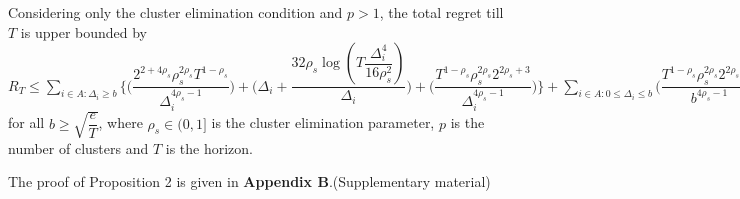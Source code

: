 	
	
	

\begin{proposition}
\label{Result:Prop:2}
Considering only the cluster elimination condition and $p>1$, the total regret till $T$ is upper bounded by $R_{T}\leq \sum_{i\in A:\Delta_{i}\geq b}\bigg\lbrace \bigg(\dfrac{2^{2+4\rho_{s}}\rho_{s}^{2\rho_{s}}T^{1-\rho_{s}}}{\Delta_{i}^{4\rho_{s}-1}}\bigg) + \bigg(\Delta_{i}+\dfrac{32\rho_{s}\log{(T\dfrac{\Delta_{i}^{4}}{16\rho_{s}^{2}})}}{\Delta_{i}}\bigg)  +  \bigg(\dfrac{T^{1-\rho_{s}}\rho_{s}^{2\rho_{s}}2^{2\rho_{s}+3}}{\Delta_{i}^{4\rho_{s} -1}} \bigg)\bigg \rbrace +\sum_{i\in A:0\leq\Delta_{i}\leq b}\bigg(\dfrac{T^{1-\rho_{s}}\rho_{s}^{2\rho_{s}}2^{2\rho_{s}+3}}{b^{4\rho_{s} -1}} \bigg) + max_{i:\Delta_{i}\leq b}\Delta_{i}T$ for all $b\geq \sqrt{\dfrac{e}{T}}$, where $\rho_{s}\in (0,1]$ is the cluster elimination parameter, $p$ is the number of clusters and $T$ is the horizon.
\end{proposition}

	The proof of Proposition 2 is given in \textbf{Appendix B}.(Supplementary material)




